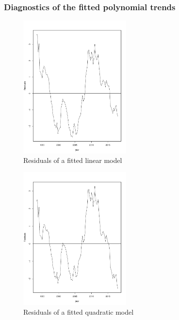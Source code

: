 \documentclass[11pt,a4paper]{article}
\begin{document}
\subsubsection{Diagnostics of the fitted polynomial trends}

\begin{figure}
\centering
\includegraphics[angle=0,
width=0.5\textwidth]{resid_linearmodel}
\caption{Residuals of a fitted linear model
\label{fig:resid_linearmodel}}
\end{figure}

\begin{figure}
\centering
\includegraphics[angle=0,
width=0.5\textwidth]{resid_quadraticmodel}
\caption{Residuals of a fitted quadratic model
\label{fig:resid_quadraticmodel}}
\end{figure}
\end{document}
